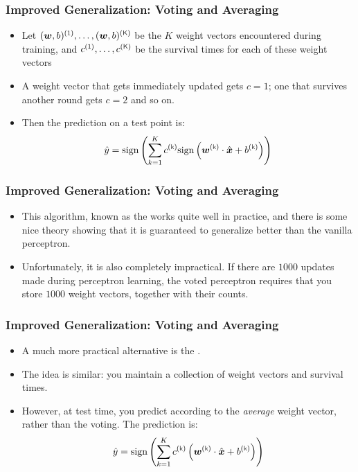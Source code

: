\documentclass[trans]{beamer}
\begin{document}
\begin{frame}
  \frametitle{Improved Generalization: Voting and Averaging}
\begin{itemize}
\item 
Let $(\vw,b)\oth, \dots,
(\vw,b)\Kth$ be the $K$ weight vectors encountered during training,
and $c\oth, \dots, c\Kth$ be the survival times for each of these
weight vectors
\item A weight vector that gets immediately updated gets
$c=1$; one that survives another round gets $c=2$ and so on.
\item  Then
the prediction on a test point is:
\begin{equation} \label{eq:perc:vote}
  \hat y = \sign \left(
    \sum_{k=1}^K c\kth 
      \sign \left(
        \dotp{\vw\kth}{\hat\vx} + b\kth
        \right)
      \right)
\end{equation}
\end{itemize}
\end{frame}
\begin{frame}
  \frametitle{Improved Generalization: Voting and Averaging}
\begin{itemize}
\item 
This algorithm, known as the  works quite
well in practice, and there is some nice theory showing that it is
guaranteed to generalize better than the vanilla perceptron.
\item 
Unfortunately, it is also completely impractical.  If there are $1000$
updates made during perceptron learning, the voted perceptron requires
that you store $1000$ weight vectors, together with their counts.

\end{itemize}
\end{frame}
\begin{frame}
  \frametitle{Improved Generalization: Voting and Averaging}
\begin{itemize}
\item 
A much more practical alternative is the .
  \item  The idea is similar: you maintain a collection of
weight vectors and survival times.  
\item However, at test time, you predict
according to the \emph{average} weight vector, rather than the
voting. The prediction is:
\begin{equation} \label{eq:perc:avg}
  \hat y = \sign \left(
    \sum_{k=1}^K c\kth 
      \left(
        \dotp{\vw\kth}{\hat\vx} + b\kth
        \right)
      \right)
\end{equation}
\end{itemize}
\end{frame}
\end{document}
